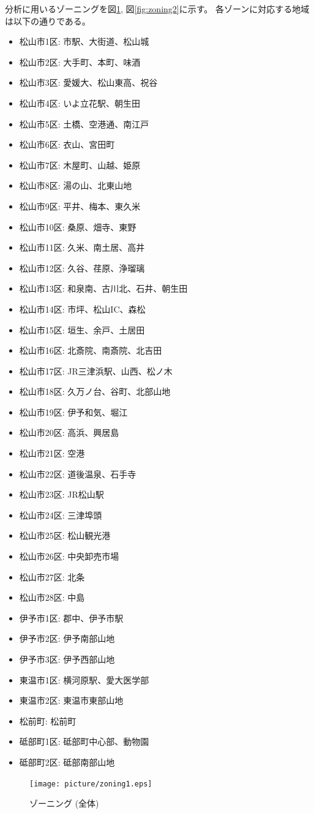 \documentclass[a4paper,12pt, uplatex]{jsbook}
\begin{document}
\clearpage
分析に用いるゾーニングを図\ref{fig:zoning1}, 図\ref{fig:zoning2}に示す。
各ゾーンに対応する地域は以下の通りである。
\begin{itemize}
  \item 松山市1区: 市駅、大街道、松山城
  \item 松山市2区: 大手町、本町、味酒
  \item 松山市3区: 愛媛大、松山東高、祝谷
  \item 松山市4区: いよ立花駅、朝生田
  \item 松山市5区: 土橋、空港通、南江戸
  \item 松山市6区: 衣山、宮田町
  \item 松山市7区: 木屋町、山越、姫原
  \item 松山市8区: 湯の山、北東山地
  \item 松山市9区: 平井、梅本、東久米
  \item 松山市10区: 桑原、畑寺、東野
  \item 松山市11区: 久米、南土居、高井
  \item 松山市12区: 久谷、荏原、浄瑠璃
  \item 松山市13区: 和泉南、古川北、石井、朝生田
  \item 松山市14区: 市坪、松山IC、森松
  \item 松山市15区: 垣生、余戸、土居田
  \item 松山市16区: 北斎院、南斎院、北吉田
  \item 松山市17区: JR三津浜駅、山西、松ノ木
  \item 松山市18区: 久万ノ台、谷町、北部山地
  \item 松山市19区: 伊予和気、堀江
  \item 松山市20区: 高浜、興居島
  \item 松山市21区: 空港
  \item 松山市22区: 道後温泉、石手寺
  \item 松山市23区: JR松山駅
  \item 松山市24区: 三津埠頭
  \item 松山市25区: 松山観光港
  \item 松山市26区: 中央卸売市場
  \item 松山市27区: 北条
  \item 松山市28区: 中島
  \item 伊予市1区: 郡中、伊予市駅
  \item 伊予市2区: 伊予南部山地
  \item 伊予市3区: 伊予西部山地
  \item 東温市1区: 横河原駅、愛大医学部
  \item 東温市2区: 東温市東部山地
  \item 松前町: 松前町
  \item 砥部町1区: 砥部町中心部、動物園
  \item 砥部町2区: 砥部南部山地
\end{itemize}
%
\begin{figure}[htbp]
    \centering
    \texttt{[image: picture/zoning1.eps]}
    \caption{ゾーニング (全体)}
    \label{fig:zoning1}
\end{figure}
\end{document}
